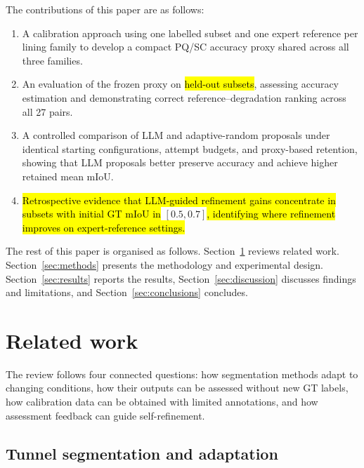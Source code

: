 \documentclass[a4paper,fleqn]{cas-dc}
\begin{document}
{The contributions of this paper are as follows:
\begin{enumerate}
\item A calibration approach using one labelled subset and one expert reference per lining family to develop a compact PQ/SC accuracy proxy shared across all three families.
\item An evaluation of the frozen proxy on \hl{held-out subsets}, assessing accuracy estimation and demonstrating correct reference--degradation ranking across all 27 pairs.
\item A controlled comparison of LLM and adaptive-random proposals under identical starting configurations, attempt budgets, and proxy-based retention, showing that LLM proposals better preserve accuracy and achieve higher retained mean mIoU.
\item \hl{Retrospective evidence that LLM-guided refinement gains concentrate in subsets with initial GT mIoU in} $[0.5,0.7]$\hl{, identifying where refinement improves on expert-reference settings.}
\end{enumerate}

The rest of this paper is organised as follows. Section~\ref{sec:related} reviews related work. Section~\ref{sec:methods} presents the methodology and experimental design. Section~\ref{sec:results} reports the results, Section~\ref{sec:discussion} discusses findings and limitations, and Section~\ref{sec:conclusions} concludes.




\section{Related work}
\label{sec:related}

The review follows four connected questions: how segmentation methods adapt to changing conditions, how their outputs can be assessed without new GT labels, how calibration data can be obtained with limited annotations, and how assessment feedback can guide self-refinement.

\subsection{Tunnel segmentation and adaptation}

}
\end{document}
